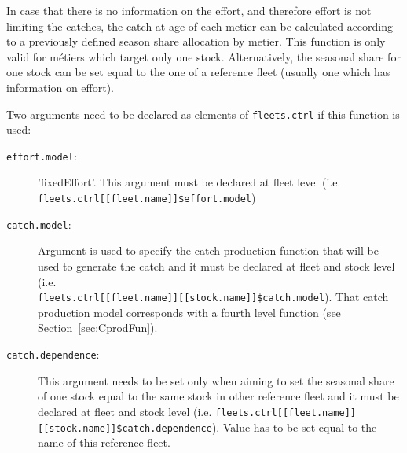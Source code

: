  	 	In case that there is no information on the effort, and therefore effort is not limiting the catches, the catch at age of
 	 	each metier can be calculated according to a previously defined season share allocation by metier. 
 	 	This function is only valid for m\'etiers which target only one stock.
 	 	Alternatively, the seasonal share for one stock can be set equal to the one of a reference fleet (usually one which has 
 	 	information on effort).
 	 	
 	 	Two arguments need to be declared as elements of \texttt{fleets.ctrl} if this function is used:
 	 	\begin{description}
			\item[\texttt{effort.model}:] 'fixedEffort'. 
			This argument must be declared at fleet level (i.e. \\ \texttt{fleets.ctrl[[fleet.name]]\$effort.model})
			\item[\texttt{catch.model}:] 
			Argument is used to specify the catch production function that will be used to generate the catch 
			and it must be declared at fleet and stock level (i.e. \\ \texttt{fleets.ctrl[[fleet.name]][[stock.name]]\$catch.model}). 
			That catch production model corresponds with a fourth level function (see Section~\ref{sec:CprodFun}).
			\item[\texttt{catch.dependence}:] This argument needs to be set only 
			  when aiming to set the seasonal share of one stock equal to the same stock in other
			  reference fleet and it must be declared at fleet and stock level 
			  (i.e. \texttt{fleets.ctrl[[fleet.name]][[stock.name]]\$catch.dependence}).
			  Value has to be set equal to the name of this reference fleet.
 	 	\end{description}
 	 	
	

